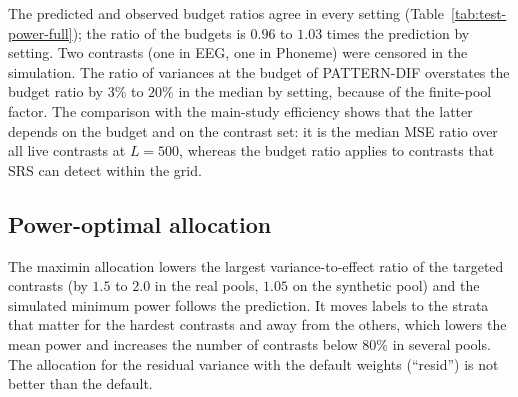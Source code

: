 \begin{table}[p]
\centering\scriptsize
\caption{Label budget for $80\%$ power of the two-sided Wald test of $H_0:\theta_k=0$ by setting. Contr.: number of contrasts with both budgets observed / selected. $V_{\rm SRS}/V_{\rm DIF}$: exact variance ratio at the PATTERN-DIF budget; MSE ratio ($L=500$): median efficiency of PATTERN-DIF against SRS in the main study (\texttt{results/label\_efficiency\_dif.json}); pred.\ and obs.: median over contrasts of the predicted and observed ratio of budgets; Within $\pm20\%$: share of contrasts with observed within $20\%$ of predicted. The last block gives SRS against PATTERN (plug-in).}\label{tab:test-power-full}

\end{table}

The predicted and observed budget ratios agree in every setting (Table~\ref{tab:test-power-full}); the ratio of the budgets is $0.96$ to $1.03$ times the prediction by setting. Two contrasts (one in EEG, one in Phoneme) were censored in the simulation. The ratio of variances at the budget of PATTERN-DIF overstates the budget ratio by $3\%$ to $20\%$ in the median by setting, because of the finite-pool factor. The comparison with the main-study efficiency shows that the latter depends on the budget and on the contrast set: it is the median MSE ratio over all live contrasts at $L=500$, whereas the budget ratio applies to contrasts that SRS can detect within the grid.

\subsection{Power-optimal allocation}

\begin{table}[p]
\centering\scriptsize
\caption{Default and maximin allocations for PATTERN-DIF ($R=1000$). E1: the $K_1$ contrasts with $|\theta_k|\ge0.02$ at effect $|\theta_k|$; E2: all $K$ contrasts at a common effect $0.05$. min and mean: minimum and mean over the targeted contrasts of the simulated power; pred.\ min: minimum predicted power; $<80\%$: number of targeted contrasts with simulated power below $0.8$. ``Default (plain)'' is the allocation of the main study, ``Default (resid)'' the Neyman allocation for the residual variance with weights $1/S_k^2$, ``Maximin, E1/E2'' the solution for the targets E1 and E2.}\label{tab:test-opt-full}

\end{table}

The maximin allocation lowers the largest variance-to-effect ratio of the targeted contrasts (by $1.5$ to $2.0$ in the real pools, $1.05$ on the synthetic pool) and the simulated minimum power follows the prediction. It moves labels to the strata that matter for the hardest contrasts and away from the others, which lowers the mean power and increases the number of contrasts below $80\%$ in several pools. The allocation for the residual variance with the default weights (``resid'') is not better than the default.

